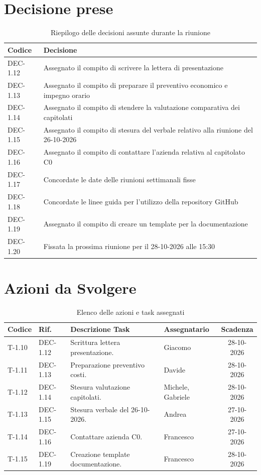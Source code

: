 \documentclass[11pt, a4paper]{article}
\begin{document}
\section{Decisione prese}
\begin{table}[htbp]
\centering
\caption{Riepilogo delle decisioni assunte durante la riunione}
\label{tab:decisioni}
\begin{tabularx}{\textwidth}{l X}
\toprule
\textbf{Codice} & \textbf{Decisione} \\
\midrule
DEC-1.12 & Assegnato il compito di scrivere la lettera di presentazione \\
DEC-1.13 & Assegnato il compito di preparare il preventivo economico e impegno orario \\
DEC-1.14 & Assegnato il compito di stendere la valutazione comparativa dei capitolati \\
DEC-1.15 & Assegnato il compito di stesura del verbale relativo alla riunione del 26-10-2026\\
DEC-1.16 & Assegnato il compito di contattare l'azienda relativa al capitolato C0 \\
DEC-1.17 & Concordate le date delle riunioni settimanali fisse \\
DEC-1.18 & Concordate le linee guida per l'utilizzo della repository GitHub \\
DEC-1.19 & Assegnato il compito di creare un template per la documentazione \\
DEC-1.20 & Fissata la prossima riunione per il 28-10-2026 alle 15:30 \\
\bottomrule
\end{tabularx}
\end{table}

\section{Azioni da Svolgere}

\begin{table}[htbp]
\centering
\caption{Elenco delle azioni e task assegnati}
\label{tab:azioni}
\begin{tabularx}{\textwidth}{l l X l c}
\toprule
\textbf{Codice} & \textbf{Rif.} & \textbf{Descrizione Task} & \textbf{Assegnatario} & \textbf{Scadenza} \\
\midrule
T-1.10 & DEC-1.12 & Scrittura lettera presentazione. & Giacomo & 28-10-2026 \\
T-1.11 & DEC-1.13 & Preparazione preventivo costi. & Davide   & 28-10-2026 \\
T-1.12 & DEC-1.14 & Stesura valutazione capitolati. & Michele, Gabriele    & 28-10-2026 \\
T-1.13 & DEC-1.15 & Stesura verbale del 26-10-2026. & Andrea & 27-10-2026 \\
T-1.14 & DEC-1.16 & Contattare azienda C0. & Francesco & 27-10-2026 \\
T-1.15 & DEC-1.19 & Creazione template documentazione. & Francesco & 28-10-2026 \\
\bottomrule
\end{tabularx}
\end{table}
\end{document}
